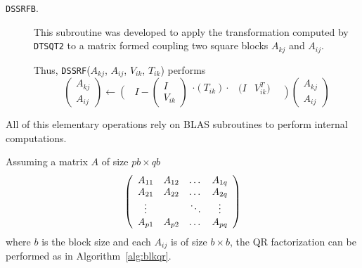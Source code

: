 \documentclass[runningheads]{llncs}
\begin{document}
\begin{description}
\item[\texttt{DSSRFB}.] This subroutine was developed to apply the
  transformation computed by \texttt{DTSQT2} to a matrix formed
  coupling two square blocks $A_{kj}$ and $A_{ij}$.

  Thus, \texttt{DSSRF}($A_{kj}$, $A_{ij}$, $V_{ik}$, $T_{ik}$)
  performs
  \begin{displaymath}
    \left(\begin{array}{c}
      A_{kj}\\
      A_{ij}
    \end{array}\right) \longleftarrow
  \left(
    \begin{array}{c}
      \\
      \\
    \end{array}\right. I -
    \left(
      \begin{array}{c}
        I \\
        V_{ik}
      \end{array}\right)
    \begin{array}{c}
     \cdot (T_{ik}) \cdot\\
      \\
    \end{array}
    \begin{array}{cc}
      (I & V^T_{ik})\\
      \\
    \end{array}  \left.
    \begin{array}{c}
      \\
      \\
    \end{array}\right)\left(\begin{array}{c}
      A_{kj}\\
      A_{ij}
    \end{array}\right)
  \end{displaymath}
\end{description}

All of this elementary operations rely on BLAS subroutines to perform
internal computations.



Assuming a matrix $A$ of size $pb \times qb$
\begin{displaymath}
  \left(\begin{array}[!h]{cccc}
    A_{11}  & A_{12} & \dots  & A_{1q}  \\
    A_{21}  & A_{22} & \dots  & A_{2q}  \\
    \vdots &       & \ddots & \vdots \\
    A_{p1}  & A_{p2} & \dots  & A_{pq}
  \end{array}\right)
\end{displaymath}
where $b$ is the block size and each $A_{ij}$ is of size $b \times b$,
the QR factorization can be performed as in Algorithm~\ref{alg:blkqr}.
\end{document}

